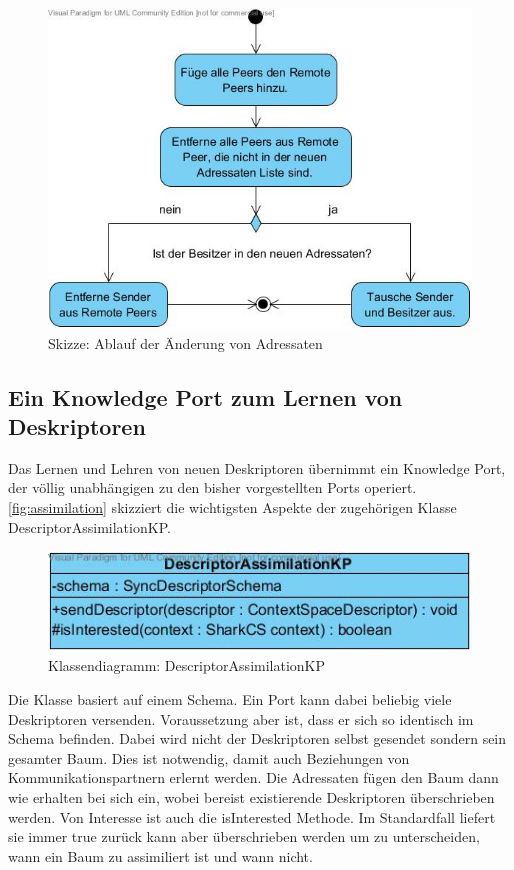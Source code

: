 \documentclass[a4paper]{article}
\begin{document}
	\begin{figure}[H]
		\centerline{
			\includegraphics[scale=0.66]{../Bilder/peer_sync.jpg}
		}
		\caption{Skizze: Ablauf der Änderung von Adressaten}
		\label{fig:peer_sync}
	\end{figure}	
		
	\subsection{Ein Knowledge Port zum Lernen von Deskriptoren}
	
	Das Lernen und Lehren von neuen Deskriptoren übernimmt ein Knowledge Port,
	der völlig unabhängigen zu den bisher vorgestellten Ports operiert.
	\autoref{fig:assimilation} skizziert die wichtigsten Aspekte der
	zugehörigen Klasse DescriptorAssimilationKP.
	
	\begin{figure}[H]
		\includegraphics[width=\linewidth]{../Bilder/assimilation.jpg}
		\caption{Klassendiagramm: DescriptorAssimilationKP}
		\label{fig:assimilation}
	\end{figure}	
	
	Die Klasse basiert auf einem Schema. Ein Port kann dabei beliebig viele
	Deskriptoren versenden. Voraussetzung aber ist, dass er sich so identisch 
	im Schema befinden. Dabei wird nicht der Deskriptoren selbst gesendet sondern
	sein gesamter Baum. Dies ist notwendig, damit auch Beziehungen von 
	Kommunikationspartnern erlernt werden. Die Adressaten fügen den
	Baum dann wie erhalten bei sich ein, wobei bereist existierende Deskriptoren 
	überschrieben werden. Von Interesse ist auch die isInterested Methode. 
	Im Standardfall liefert sie immer true zurück kann aber überschrieben werden
	um zu unterscheiden, wann ein Baum zu assimiliert ist und wann nicht.
	
\end{document}

